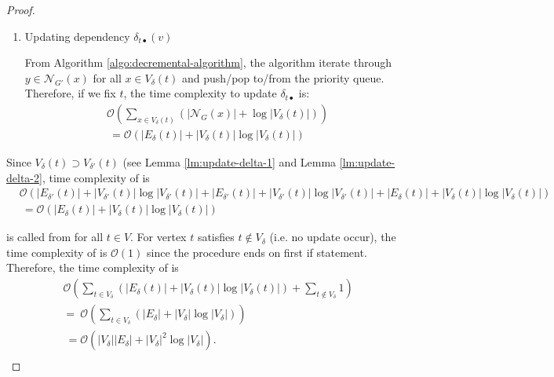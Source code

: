 \begin{proof}
\begin{enumerate}[label=(\alph*)]
  \item Updating dependency $\delta_{t\bullet}(v)$
    \par From Algorithm \ref{algo:decremental-algorithm}, the algorithm iterate through $y\in\mathcal{N}_{G'}(x)$ for all $x\in V_{\delta}(t)$ and push/pop to/from the priority queue.
    Therefore, if we fix $t$, the time complexity to update $\delta_{t\bullet}$ is:
    \begin{equation}
      \begin{aligned}
        &\mathcal{O}(\sum_{x\in V_\delta(t)}(\lvert\mathcal{N}_G(x)\rvert
        +\log\lvert V_\delta(t)\rvert)) \nonumber\\
        &\:=\mathcal{O}(\lvert E_\delta(t)\rvert
        +\lvert V_\delta(t)\rvert\log\lvert V_\delta(t)\rvert) \nonumber
      \end{aligned}
    \end{equation}
  \end{enumerate}

  Since $V_\delta(t)\supset V_{\delta'}(t)$ (see Lemma \ref{lm:update-delta-1} and Lemma \ref{lm:update-delta-2},
  time complexity of  is
  \begin{equation*}
    \begin{aligned}
      &\mathcal{O}(
      \lvert E_{\delta'}(t)\rvert+\lvert V_{\delta'}(t)\rvert\log\lvert V_{\delta'}(t)\rvert
      +\lvert E_{\delta'}(t)\rvert+\lvert V_{\delta'}(t)\rvert\log\lvert V_{\delta'}(t)\rvert
      +\lvert E_\delta(t)\rvert+\lvert V_\delta(t)\rvert\log\lvert V_\delta(t)\rvert
      ) \nonumber\\
      &\:=\mathcal{O}(\lvert E_\delta(t)\rvert+\lvert V_\delta(t)\rvert\log\lvert V_\delta(t)\rvert)
    \end{aligned}
  \end{equation*}

   is called from  for all $t\in V$.
  For vertex $t$ satisfies $t\notin V_\delta$ (i.e. no update occur),
  the time complexity of  is $\mathcal{O}(1)$ since the procedure ends on first if statement.
  Therefore, the time complexity of  is
  \begin{equation*}
    \begin{aligned}
      &\mathcal{O}(
      \sum_{t\in V_\delta}(\lvert E_\delta(t)\rvert+\lvert V_\delta(t)\rvert\log\lvert V_\delta(t)\rvert)
      +\sum_{t\notin V_\delta}1) \nonumber\\
      &=\:\mathcal{O}(\sum_{t\in V_\delta}(\lvert E_\delta\rvert
      +\lvert V_\delta\rvert\log\lvert V_\delta\rvert))\nonumber\\
      &\:=\mathcal{O}(\lvert V_\delta\rvert\lvert E_\delta\rvert
      +\lvert V_\delta\rvert^2\log\lvert V_\delta\rvert) \nonumber.\\
    \end{aligned}
  \end{equation*}
\end{proof}

